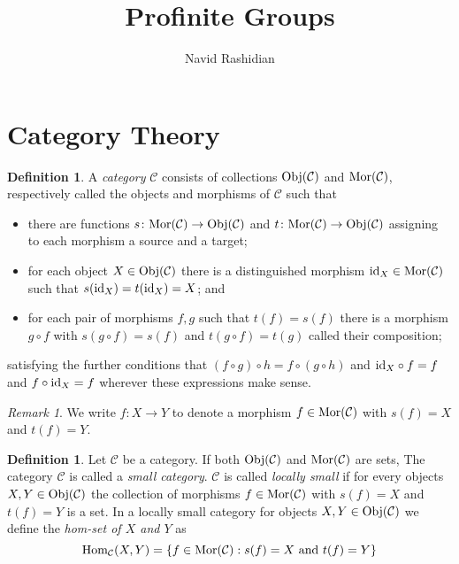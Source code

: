 \documentclass[12pt]{article}
\title{Profinite Groups}
\author{Navid Rashidian}
\date{}
\theoremstyle{definition}
\newtheorem{dfn}[thm]{Definition}
\theoremstyle{remark}
\newtheorem{rem}[thm]{Remark}
\newcommand{\catvar}[1]{\mathcal{#1}}
\newcommand{\CC}{\catvar{C}}
\newcommand{\Obj}[1]{\textup{Obj}(#1)}
\newcommand{\Mor}[1]{\textup{Mor}(#1)}
\begin{document}
    \maketitle

    \section{Category Theory}

    \begin{dfn}
        A \emph{category} $\mathcal{C}$ consists of collections $\Obj{\CC}$ and $\Mor{\CC}$, respectively called the objects and morphisms of $\CC$ such that
        \begin{itemize}
            \item there are functions $s\colon\Mor{\CC}\to\Obj{\CC}$ and $t\colon\Mor{\CC}\to\Obj{\CC}$  assigning to each morphism a source and a target;
            \item for each object $X\in\Obj{\CC}$ there is a distinguished morphism $\textup{id}_X\in\Mor{\CC}$ such that $s(\textup{id}_X)=t(\textup{id}_X)=X$; and
            \item for each pair of morphisms $f,g$ such that $t(f)=s(f)$ there is a morphism $g\circ f$ with $s(g\circ f)=s(f)$ and $t(g\circ f)=t(g)$ called their composition;
        \end{itemize}
        satisfying the further conditions that $(f\circ g)\circ h=f\circ(g\circ h)$ and $\textup{id}_X\circ f=f$ and $f\circ\textup{id}_X=f$ wherever these expressions make sense.
    \end{dfn}

    \begin{rem}
        We write $f\colon X\to Y$ to denote a morphism $f\in\Mor{\CC}$ with $s(f)=X$ and $t(f)=Y$.
    \end{rem}

    \begin{dfn}
        Let $\CC$ be a category. If both $\Obj{\CC}$ and $\Mor{\CC}$ are sets, The category $\CC$ is called a \emph{small category}. $\CC$ is called \emph{locally small} if for every objects $X,Y\in\Obj{\CC}$ the collection of morphisms $f\in\Mor{\CC}$ with $s(f)=X$ and $t(f)=Y$ is a set. In a locally small category for objects $X,Y\in\Obj{\CC}$ we define the \emph{hom-set of $X$ and $Y$} as
        $$
            \textup{Hom}_\CC(X,Y)=\{f\in\Mor{\CC}:s(f)=X\ \textup{and}\ t(f)=Y\}
        $$
    \end{dfn}
\end{document}
